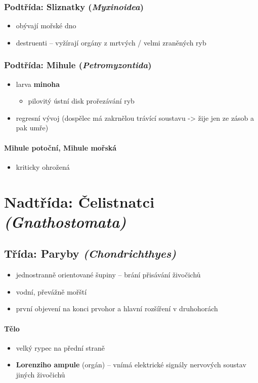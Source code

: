 \subsubsection{Podtřída: Sliznatky (\textit{Myxinoidea})}
\begin{itemize}
\item obývají mořské dno
\item destruenti -- vyžírají orgány z mrtvých / velmi zraněných ryb
\end{itemize}

\subsubsection{Podtřída: Mihule (\textit{Petromyzontida})}
\begin{itemize}
\item larva \textbf{minoha}
	\begin{itemize}
	\item pilovitý ústní disk \ra prořezávání ryb
	\end{itemize}
\item regresní vývoj (dospělec má zakrnělou trávící soustavu -> žije jen ze zásob a pak umře)
\end{itemize}

\paragraph{Mihule potoční, Mihule mořská}
\begin{itemize}
\item kriticky ohrožená
\end{itemize}


\section{Nadtřída: Čelistnatci \textit{(Gnathostomata)}}
\subsection{Třída: Paryby \textit{(Chondrichthyes)}}
\begin{itemize}
\item jednostranně orientované šupiny -- brání přisávání živočichů
\item vodní, převážně mořští
\item první objevení na konci prvohor a hlavní rozšíření v druhohorách
\end{itemize}

\paragraph{Tělo}
\begin{itemize}
\item velký rypec na přední straně
\item \textbf{Lorenziho ampule} (orgán) -- vnímá elektrické signály nervových soustav jiných živočichů
\end{itemize}

